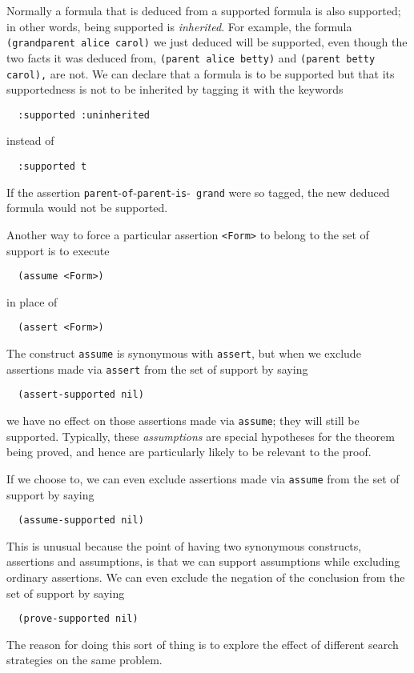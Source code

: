 Normally a formula that is deduced from a supported formula is also
supported; in other words, being supported is {\em inherited}.
For example, the formula
  \verb'(grandparent alice carol)'
we just deduced will be supported, even though the two facts it was deduced
from,
\verb'(parent alice betty)' and \verb'(parent betty carol),' are not.
We can
declare that a formula is to be supported but that its supportedness is not
to be inherited by tagging it with the keywords
\begin{verbatim}
  :supported :uninherited
\end{verbatim}
instead of
\begin{verbatim}
  :supported t
\end{verbatim}
If the assertion {\tt parent}-{\tt of}-{\tt parent}-{\tt is}-{\tt
grand} were so tagged, the new deduced formula would not be
supported.


Another way to force a particular assertion {\tt <Form>} to belong to the set
of support is to execute
\begin{verbatim}
  (assume <Form>)
\end{verbatim}
in place of
\begin{verbatim}
  (assert <Form>)
\end{verbatim}
The construct {\tt assume} is synonymous with {\tt assert}, but when we
exclude assertions made via {\tt assert} from the set of support by saying
\begin{verbatim}
  (assert-supported nil)
\end{verbatim}
we have no effect on those assertions made via {\tt assume};  they will still
be supported.  Typically, these {\em assumptions}
are special hypotheses for the theorem being proved, and hence are
particularly likely to be relevant to the proof.

If we choose to, we can even exclude assertions made via {\tt assume} from the
set of support by saying
\begin{verbatim}
  (assume-supported nil)
\end{verbatim}
This is unusual because the point of having two synonymous constructs,
assertions and assumptions, is that we can support assumptions while
excluding ordinary assertions.  We can even exclude the negation of the
conclusion from the set of support by saying
\begin{verbatim}
  (prove-supported nil)
\end{verbatim}
The reason for doing this sort of thing is to explore the effect of different
search strategies on the same problem.

